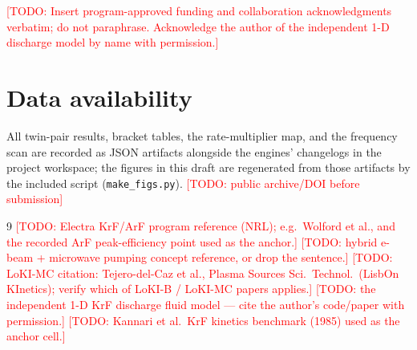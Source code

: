 \documentclass[aps,pra,preprint,longbibliography,nofootinbib]{revtex4-2}
\newcommand{\todo}[1]{\textcolor{red}{[TODO: #1]}}
\begin{document}
\begin{acknowledgments}
\todo{Insert program-approved funding and collaboration acknowledgments
verbatim; do not paraphrase. Acknowledge the author of the independent
1-D discharge model by name with permission.}
\end{acknowledgments}

\section*{Data availability}

All twin-pair results, bracket tables, the rate-multiplier map, and
the frequency scan are recorded as JSON artifacts alongside the
engines' changelogs in the project workspace; the figures in this
draft are regenerated from those artifacts by the included script
(\texttt{make\_figs.py}). \todo{public archive/DOI before submission}

\begin{thebibliography}{9}
 \todo{Electra KrF/ArF program reference (NRL);
e.g.\ Wolford et al., and the recorded ArF peak-efficiency point used
as the anchor.}
 \todo{hybrid e-beam + microwave pumping
concept reference, or drop the sentence.}
 \todo{LoKI-MC citation: Tejero-del-Caz et al., Plasma
Sources Sci.\ Technol.\ (LisbOn KInetics); verify which of LoKI-B /
LoKI-MC papers applies.}
 \todo{the independent 1-D KrF discharge fluid model ---
cite the author's code/paper with permission.}
 \todo{Kannari et al.\ KrF kinetics benchmark (1985)
used as the anchor cell.}
\end{thebibliography}
\end{document}
